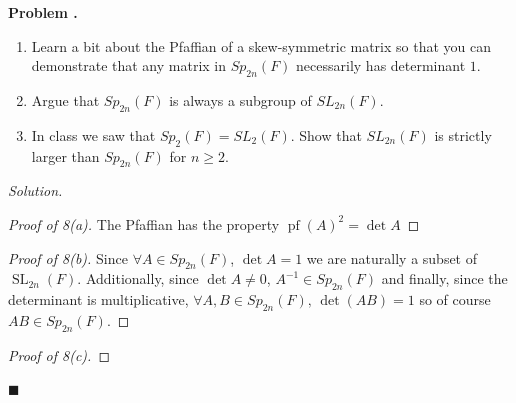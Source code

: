 \documentclass[11pt]{article}
\theoremstyle{plain}
\theoremstyle{definition}
\newcounter{problemnum}
\newenvironment{problem}[1][]{%
  \refstepcounter{problemnum}%
  \par\medskip\noindent\textbf{Problem \theproblemnum{#1}.}\ \itshape
}{\par\medskip}
\newenvironment{solution}{%
  \par\noindent\textit{Solution.}\
}{%
  \hfill$\blacksquare$\par\bigskip
}
\DeclareMathOperator{\SL}{SL}
\DeclareMathOperator{\pf}{pf}
\begin{document}
\begin{problem}
  \begin{enumerate}[label=(\alph*)]
    \item Learn a bit about the Pfaffian of a skew-symmetric matrix so
      that you can demonstrate that any matrix in $Sp_{2n}(F)$
      necessarily has determinant $1$.

    \item Argue that $Sp_{2n}(F)$ is always a subgroup of $SL_{2n}(F)$.

    \item In class we saw that $Sp_2(F) = SL_2(F)$. Show that
      $SL_{2n}(F)$ is strictly larger than $Sp_{2n}(F)$ for $n \geq 2$.
  \end{enumerate}
\end{problem}

\begin{solution}
  \begin{proof}[Proof of 8(a)]
    The Pfaffian has the property \( \pf(A)^2 = \det A \)
  \end{proof}

  \begin{proof}[Proof of 8(b)]
    Since \( \forall A \in Sp_{2n}(F)\), \( \det A = 1 \) we are
    naturally a subset of \( \SL_{2n}(F) \). Additionally, since \(
    \det A \neq 0 \), \( A^{-1}\in Sp_{2n}(F) \) and finally, since
    the determinant is multiplicative, \( \forall A,B\in
    Sp_{2n}(F),\,\det (AB)=1 \) so of course \( AB\in Sp_{2n}(F) \).
  \end{proof}

  \begin{proof}[Proof of 8(c)]
  \end{proof}
\end{solution}
\end{document}
